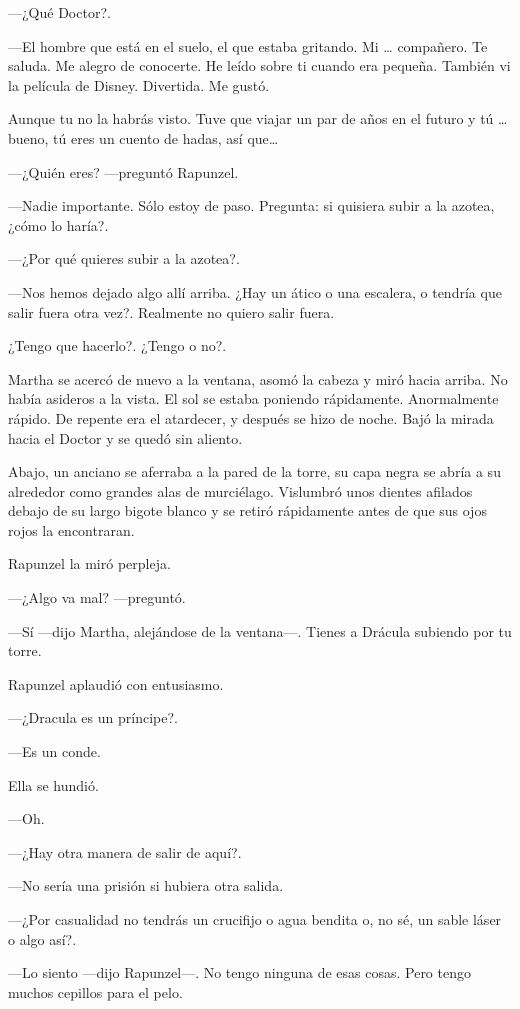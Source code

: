 ---¿Qué Doctor?.

---El hombre que está en el suelo, el que estaba gritando. Mi \ldots{} compañero. Te saluda. Me alegro de conocerte. He leído sobre ti cuando era pequeña. También vi la película de Disney. Divertida. Me gustó.

Aunque tu no la habrás visto. Tuve que viajar un par de años en el futuro y tú \ldots{} bueno, tú eres un cuento de hadas, así que\ldots{}

---¿Quién eres? ---preguntó Rapunzel.

---Nadie importante. Sólo estoy de paso. Pregunta: si quisiera subir a la azotea, ¿cómo lo haría?.

---¿Por qué quieres subir a la azotea?.

---Nos hemos dejado algo allí arriba. ¿Hay un ático o una escalera, o tendría que salir fuera otra vez?. Realmente no quiero salir fuera.

¿Tengo que hacerlo?. ¿Tengo o no?.

Martha se acercó de nuevo a la ventana, asomó la cabeza y miró hacia arriba. No había asideros a la vista. El sol se estaba poniendo rápidamente. Anormalmente rápido. De repente era el atardecer, y después se hizo de noche. Bajó la mirada hacia el Doctor y se quedó sin aliento.

Abajo, un anciano se aferraba a la pared de la torre, su capa negra se abría a su alrededor como grandes alas de murciélago. Vislumbró unos dientes afilados debajo de su largo bigote blanco y se retiró rápidamente antes de que sus ojos rojos la encontraran.

Rapunzel la miró perpleja.

---¿Algo va mal? ---preguntó.

---Sí ---dijo Martha, alejándose de la ventana---. Tienes a Drácula subiendo por tu torre.

Rapunzel aplaudió con entusiasmo.

---¿Dracula es un príncipe?.

---Es un conde.

Ella se hundió.

---Oh.

---¿Hay otra manera de salir de aquí?.

---No sería una prisión si hubiera otra salida.

---¿Por casualidad no tendrás un crucifijo o agua bendita o, no sé, un sable láser o algo así?.

---Lo siento ---dijo Rapunzel---. No tengo ninguna de esas cosas. Pero tengo muchos cepillos para el pelo.

